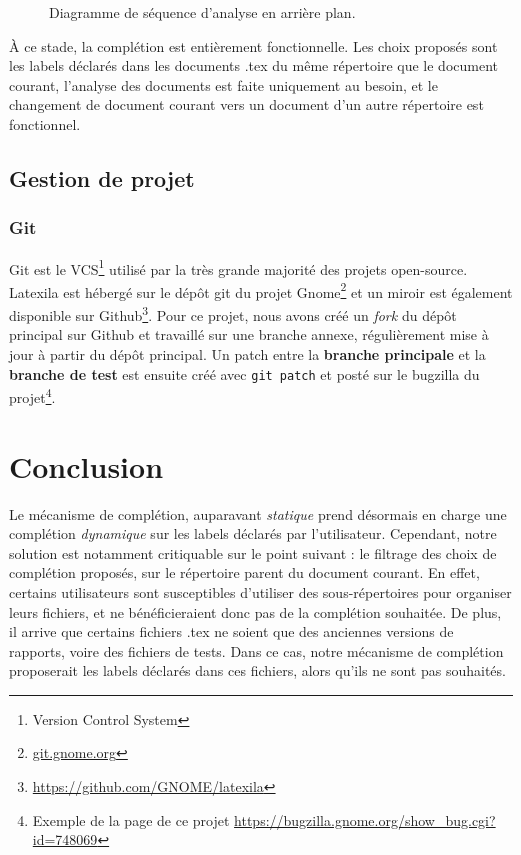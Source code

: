\documentclass[a4paper,11pt]{report}
\begin{document}
\begin{figure}[h]
\label{fig:multiple_doc_completion}
\centering

\caption{Diagramme de séquence d'analyse en arrière plan.}
\end{figure}

À ce stade, la complétion est entièrement fonctionnelle.
Les choix proposés sont les labels déclarés dans les documents .tex du même répertoire que le document courant, l'analyse des documents est faite uniquement au besoin, et le changement de document courant vers un document d'un autre répertoire est fonctionnel.


\section{Gestion de projet} %

\subsection{Git}
\label{sub:git}
Git est le VCS\footnote{Version Control System} utilisé par la très grande majorité des projets open-source. Latexila est hébergé sur le dépôt git du projet Gnome\footnote{\url{git.gnome.org}}  et un miroir est également disponible sur Github\footnote{\url{https://github.com/GNOME/latexila}}.
Pour ce projet, nous avons créé un \textit{fork} du dépôt principal sur Github et travaillé sur une branche annexe, régulièrement mise à jour à partir du dépôt principal.
Un patch entre la \textbf{branche principale} et la \textbf{branche de test} est ensuite créé avec \texttt{git patch} et posté sur le bugzilla du projet\footnote{Exemple de la page de ce projet \url{https://bugzilla.gnome.org/show_bug.cgi?id=748069}}.

\chapter{Conclusion}
Le mécanisme de complétion, auparavant \textit{statique} prend désormais en charge une complétion \textit{dynamique} sur les labels déclarés par l'utilisateur.
Cependant, notre solution est notamment critiquable sur le point suivant : le filtrage des choix de complétion proposés, sur le répertoire parent du document courant.
En effet, certains utilisateurs sont susceptibles d'utiliser des sous-répertoires pour organiser leurs fichiers, et ne bénéficieraient donc pas de la complétion souhaitée.
De plus, il arrive que certains fichiers .tex ne soient que des anciennes versions de rapports, voire des fichiers de tests. Dans ce cas, notre mécanisme de complétion proposerait les labels déclarés dans ces fichiers, alors qu'ils ne sont pas souhaités.
\end{document}

